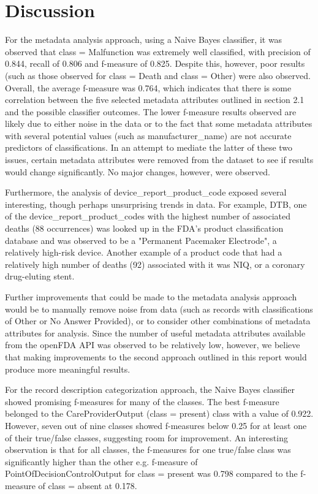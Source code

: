 \documentclass[11pt, notitlepage,abstracton,oneside]{article}   	%
\begin{document}
\section{Discussion}

For the metadata analysis approach, using a Naive Bayes classifier, it was observed that class = Malfunction was extremely well classified, with precision of 0.844, recall of 0.806 and f-measure of 0.825. Despite this, however, poor results (such as those observed for class = Death and class = Other) were also observed. Overall, the average f-measure was 0.764, which indicates that there is some correlation between the five selected metadata attributes outlined in section 2.1 and the possible classifier outcomes. The lower f-measure results observed are likely due to either noise in the data or to the fact that some metadata attributes with several potential values (such as manufacturer\_name) are not accurate predictors of classifications. In an attempt to mediate the latter of these two issues, certain metadata attributes were removed from the dataset to see if results would change significantly. No major changes, however, were observed.

Furthermore, the analysis of device\_report\_product\_code exposed several interesting, though perhaps unsurprising trends in data. For example, DTB, one of the device\_report\_product\_codes with the highest number of associated deaths (88 occurrences) was looked up in the FDA's product classification database and was observed to be a "Permanent Pacemaker Electrode", a relatively high-risk device. Another example of a product code that had a relatively high number of deaths (92) associated with it was NIQ, or a coronary drug-eluting stent.

Further improvements that could be made to the metadata analysis approach would be to manually remove noise from data (such as records with classifications of Other or No Answer Provided), or to consider other combinations of metadata attributes for analysis. Since the number of useful metadata attributes available from the openFDA API was observed to be relatively low, however, we believe that making improvements to the second approach outlined in this report would produce more meaningful results.

For the record description categorization approach, the Naive Bayes classifier showed promising f-measures for many of the classes. The best f-measure belonged to the CareProviderOutput (class = present) class with a value of 0.922. However, seven out of nine classes showed f-measures below 0.25 for at least one of their true/false classes, suggesting room for improvement. An interesting observation is that for all classes, the f-measures for one true/false class was significantly higher than the other e.g. f-measure of PointOfDecisionControlOutput for class = present was 0.798 compared to the f-measure of class = absent at 0.178.
\end{document}

